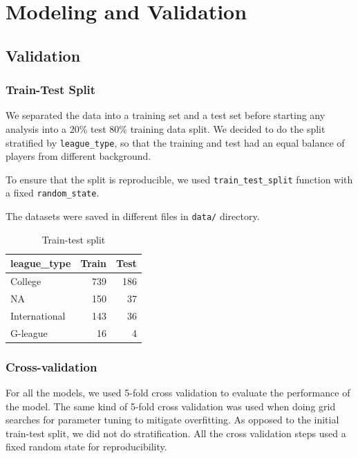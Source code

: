 
\section{Modeling and Validation}%
\label{sec:modeling-and-validation}

\subsection{Validation}%
\label{sub:validation}

\subsubsection{Train-Test Split}%

We separated the data into a training set and a test set before starting any analysis
into a 20\% test 80\% training data split. We decided to do the split stratified by
\texttt{league\_type}, so that the training and test had an equal balance of players from
different background.

To ensure that the split is reproducible,
we used \texttt{train\_test\_split} function with a fixed \texttt{random\_state}.

The datasets were saved in different files in \texttt{data/} directory.

%
\begin{table}[htb]
\centering
\caption{Train-test split}
\label{tab:train-test-split}
\begin{tabular}{lrr}
  \toprule
  \textbf{league\_type} & \textbf{Train} & \textbf{Test} \\
  \midrule
  College        &  739  & 186 \\
  NA             &  150  &  37 \\
  International  &  143  &  36 \\
  G-league       &   16  &   4 \\
  \bottomrule
\end{tabular}
\end{table}

\subsubsection{Cross-validation}%
\label{ssub:cross-validation}

For all the models, we used 5-fold cross validation to evaluate the performance
of the model. The same kind of 5-fold cross validation was used when doing grid
searches for parameter tuning to mitigate overfitting. As opposed to the initial
train-test split, we did not do stratification. All the cross validation steps
used a fixed random state for reproducibility.

